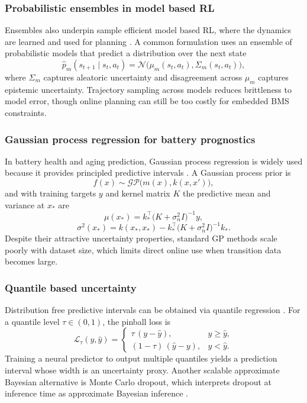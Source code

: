 \documentclass[%
 aip,
 amsmath,amssymb,
reprint, onecolumn %
]{revtex4-1}
\begin{document}
\subsubsection{Probabilistic ensembles in model based RL}
Ensembles also underpin sample efficient model based RL, where the dynamics are learned and used for planning \cite{chua2018deep}. A common formulation uses an ensemble of probabilistic models that predict a distribution over the next state
\begin{equation}
\hat{p}_m(s_{t+1}\mid s_t,a_t)=\mathcal{N}\bigl(\mu_m(s_t,a_t),\Sigma_m(s_t,a_t)\bigr),
\label{eq_pets_prob_model}
\end{equation}
where $\Sigma_m$ captures aleatoric uncertainty and disagreement across $\mu_m$ captures epistemic uncertainty. Trajectory sampling across models reduces brittleness to model error, though online planning can still be too costly for embedded BMS constraints.

\subsubsection{Gaussian process regression for battery prognostics}
In battery health and aging prediction, Gaussian process regression is widely used because it provides principled predictive intervals \cite{liu2019gaussian}. A Gaussian process prior is
\begin{equation}
f(x)\sim \mathcal{GP}\bigl(m(x),k(x,x')\bigr),
\label{eq_gp_prior}
\end{equation}
and with training targets $y$ and kernel matrix $K$ the predictive mean and variance at $x_\ast$ are
\begin{equation}
\mu(x_\ast)=k_\ast^\top\bigl(K+\sigma_n^2 I\bigr)^{-1}y,
\label{eq_gp_post_mean}
\end{equation}
\begin{equation}
\sigma^2(x_\ast)=k(x_\ast,x_\ast)-k_\ast^\top\bigl(K+\sigma_n^2 I\bigr)^{-1}k_\ast.
\label{eq_gp_post_var}
\end{equation}
Despite their attractive uncertainty properties, standard GP methods scale poorly with dataset size, which limits direct online use when transition data becomes large.

\subsubsection{Quantile based uncertainty}
Distribution free predictive intervals can be obtained via quantile regression \cite{koenker2001quantile}. For a quantile level $\tau\in(0,1)$, the pinball loss is
\begin{equation}
\mathcal{L}_{\tau}(y,\hat{y})=
\begin{cases}
\tau\,(y-\hat{y}), & y\ge \hat{y},\\
(1-\tau)\,(\hat{y}-y), & y<\hat{y}.
\end{cases}
\label{eq_pinball_loss}
\end{equation}
Training a neural predictor to output multiple quantiles yields a prediction interval whose width is an uncertainty proxy. Another scalable approximate Bayesian alternative is Monte Carlo dropout, which interprets dropout at inference time as approximate Bayesian inference \cite{gal2016dropout}.
\end{document}
